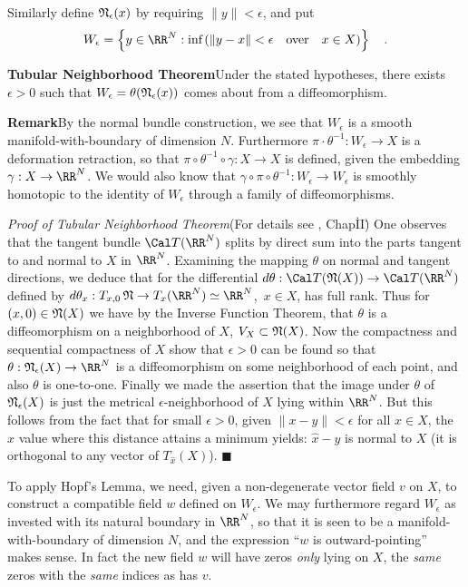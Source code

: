 Similarly define $\frak N_{\epsilon}(x) $ by requiring $\|y\| < \epsilon$, and put
$$W_{\epsilon} = \left\{y \in \RR^N: \text{inf}\left(\|y - x\| < \epsilon\quad\text{over}\quad x\in X\right)\right\}\quad .$$

\bigskip
\noindent
{\bf Tubular Neighborhood Theorem}\quad Under the stated hypotheses, there exists $\epsilon > 0$ such that $W_{\epsilon} = \theta (\frak N_{\epsilon}(x))$ comes about from a diffeomorphism.

\bigskip
\noindent
{\bf Remark}\quad By the normal bundle con\-struc\-tion, we see that $W_{\epsilon}$ is a smooth manifold-with-boundary of dimension $N$. Furthermore $\pi \cdot \theta^{-1}: W_{\epsilon} \to X$ is a deformation retraction, so that $\pi \circ \theta^{-1} \circ \gamma: X \to X$ is defined, given the embedding $\gamma: X \to \RR^N$. We would also know that $\gamma \circ \pi \circ \theta^{-1}: W_{\epsilon}\to W_{\epsilon}$ is smoothly homotopic to the identity of $W_{\epsilon}$ through a family of diffeomorphisms.


\bigskip
\noindent
{\it Proof of Tubular Neighborhood Theorem}\quad (For details see \cite{Bredon}, Chap\. II\.) One observes that the tangent bundle $\Cal T(\RR^N)$ splits by direct sum into the parts tangent to and normal to $X$ in $\RR^N$. Examining the mapping $\theta$ on normal and tangent directions, we deduce that for the differential $d \theta :{\Cal T} (\frak N(X)) \to {\Cal T}(\RR^N)$ defined by $d \theta_x: T_{x, 0}\, \frak N \to T_x (\RR^N) \simeq \RR^N$, $\,x \in X$, has full rank. Thus for $(x, 0) \in \frak N(X)$ we have by the Inverse Function Theorem, that $\theta$ is a diffeomorphism on a neighborhood of $X$, $V_X \subset \frak N(X)$. Now the compactness and sequential compactness of $X$ show that $\epsilon > 0$ can be found so that $\theta : \frak N_{\epsilon}(X) \to \RR^N$ is a diffeomorphism on some neighborhood of each point, and also $\theta$ is one-to-one. Finally we made the assertion that the image under $\theta$ of $\frak N_{\epsilon}(X)$ is just the metrical $\epsilon$-neighborhood of $X$ lying within $\RR^N$. But this follows from the fact that for small $\epsilon > 0$, given $\|x - y\| < \epsilon$ for all $x \in X$, the $\hat{x}$ value where this distance attains a minimum yields: $\hat{x}-y$ is normal to $X$ (it is orthogonal to any vector of $T_{\hat{x}}(X)$). \hfill $\blacksquare$

\bigskip
To apply Hopf's Lemma, we need, given a non-degenerate vector field $v$ on $X$, to construct a compatible field $w$ defined on $W_{\epsilon}$. We may furthermore regard $W_{\epsilon}$ as invested with its natural boundary in $\RR^N$, so that it is seen to be a manifold-with-boundary of dimension $N$, and the expression ``$w$ is outward-pointing'' makes sense. In fact the new field $w$ will have zeros {\it only} lying on $X$, the {\it same} zeros with the {\it same} indices as has $v$.

